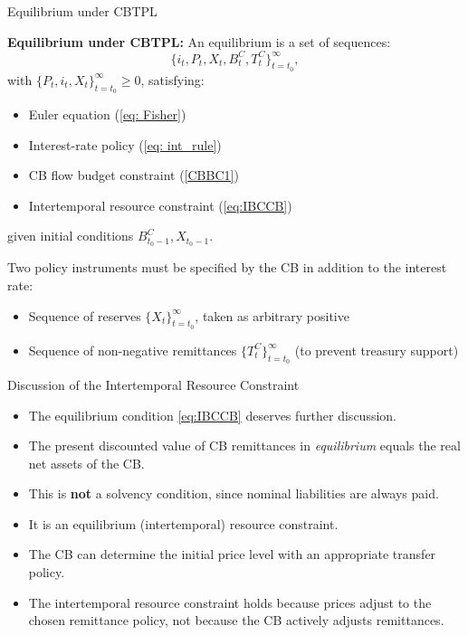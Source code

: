 \documentclass[11pt,aspectratio=169]{beamer}
\begin{document}
\begin{frame}{Equilibrium under CBTPL}

\textbf{Equilibrium under CBTPL:}  
An equilibrium is a set of sequences:
\[
\{ i_t, P_t, X_t, B_t^C, T_t^C \}_{t=t_0}^\infty,
\]
with $\{P_t, i_t, X_t \}_{t=t_0}^\infty \geq 0$, satisfying:
\begin{itemize}
  \item Euler equation (\ref{eq: Fisher})
  \item Interest-rate policy (\ref{eq: int_rule})
  \item CB flow budget constraint (\ref{CBBC1})
  \item Intertemporal resource constraint (\ref{eq:IBCCB})
\end{itemize}

given initial conditions $B_{t_0-1}^C, X_{t_0-1}$.  
\break

Two policy instruments must be specified by the CB in addition to the interest rate:
\begin{itemize}
  \item Sequence of reserves $\{X_t\}_{t=t_0}^\infty$, taken as arbitrary positive
  \item Sequence of non-negative remittances $\{T_t^C\}_{t=t_0}^\infty$ (to prevent treasury support)
\end{itemize}

\end{frame}

\begin{frame}{Discussion of the Intertemporal Resource Constraint}
\begin{itemize}
    \item The equilibrium condition \eqref{eq:IBCCB} deserves further discussion.
    \vspace{0.25cm}
    \item The present discounted value of CB remittances in \textit{equilibrium} equals the real net assets of the CB.
\vspace{0.25cm}
\item This is \textbf{not} a solvency condition, since nominal liabilities are always paid.
\vspace{0.25cm}
\item It is an equilibrium (intertemporal) resource constraint.

\vspace{0.25cm}
\item The CB can determine the initial price level with an appropriate transfer policy.

\vspace{0.25cm}
\item The intertemporal resource constraint holds because prices adjust to the chosen remittance policy, not because the CB actively adjusts remittances.

\end{itemize}
\end{frame}
\end{document}
